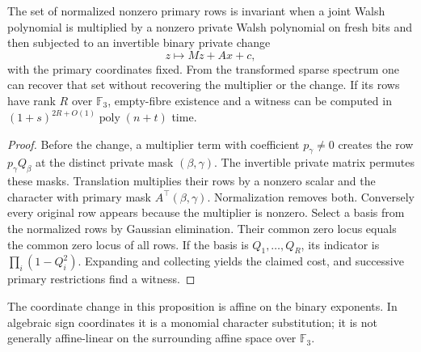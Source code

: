 \begin{proposition}
\label{st:row-recovery}
The set of normalized nonzero primary rows is invariant when a joint Walsh polynomial is multiplied by a nonzero private Walsh polynomial on fresh bits and then subjected to an invertible binary private change
\[
 z\longmapsto Mz+Ax+c,
\]
with the primary coordinates fixed. From the transformed sparse spectrum one can recover that set without recovering the multiplier or the change. If its rows have rank $R$ over $\mathbb F_3$, empty-fibre existence and a witness can be computed in $(1+s)^{2R+O(1)}\operatorname{poly}(n+t)$ time.
\end{proposition}
\begin{proof}
Before the change, a multiplier term with coefficient $p_\gamma\ne0$ creates the row $p_\gamma Q_\beta$ at the distinct private mask $(\beta,\gamma)$. The invertible private matrix permutes these masks. Translation multiplies their rows by a nonzero scalar and the character with primary mask $A^\top(\beta,\gamma)$. Normalization removes both. Conversely every original row appears because the multiplier is nonzero. Select a basis from the normalized rows by Gaussian elimination. Their common zero locus equals the common zero locus of all rows. If the basis is $Q_1,\ldots,Q_R$, its indicator is $\prod_i(1-Q_i^2)$. Expanding and collecting yields the claimed cost, and successive primary restrictions find a witness.
\end{proof}
The coordinate change in this proposition is affine on the binary exponents. In algebraic sign coordinates it is a monomial character substitution; it is not generally affine-linear on the surrounding affine space over $\mathbb F_3$.

